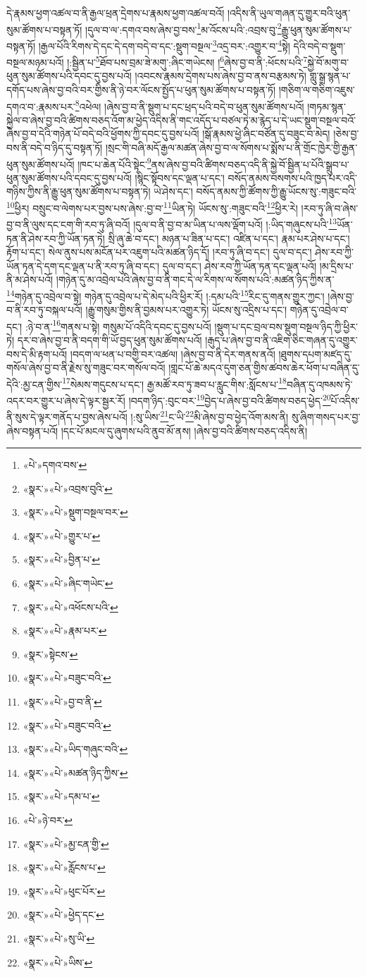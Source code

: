 དེ་རྣམས་ཕྱག་འཚལ་བ་ནི་རྒྱལ་ཕྲན་དྲེགས་པ་རྣམས་ཕྱག་འཚལ་བའོ། །འདིས་ནི་ཡུལ་གཞན་དུ་གྱུར་བའི་ཕུན་སུམ་ཚོགས་པ་བསྟན་ཏོ། །དུལ་བ་ལ་:དགའ་བས་ཞེས་བྱ་བས་\footnote{«པེ་»དགའ་བས་}མ་འོངས་པའི་:འབྲས་བུ་\footnote{«སྣར་»«པེ་»འབྲས་བུའི་}རྒྱུ་ཕུན་སུམ་ཚོགས་པ་བསྟན་ཏོ། །རྒྱལ་པོའི་རིགས་དེ་དང་དེ་དག་བདེ་བ་དང་:སྡུག་བསྔལ་\footnote{«སྣར་»«པེ་»སྡུག་བསྔལ་བར་}འདྲ་བར་:འགྱུར་བ་\footnote{«སྣར་»«པེ་»གྱུར་པ་}སྟེ། དེའི་བདེ་བ་སྡུག་བསྔལ་མཉམ་པའོ། །:སྦྱིན་པ་\footnote{«སྣར་»«པེ་»བྱིན་པ་}ཐོབ་པས་བྲམ་ཟེ་མགུ་:ཞིང་གཡེངས། །\footnote{«སྣར་»«པེ་»ཞིང་གཡེང་}ཞེས་བྱ་བ་ནི་:ཕོངས་པའི་\footnote{«སྣར་»«པེ་»འཕོངས་པའི་}སྐྱེ་བོ་མགུ་བ་ཕུན་སུམ་ཚོགས་པའི་དབང་དུ་བྱས་པའོ། །འབངས་རྣམས་དྲེགས་པས་ཞེས་བྱ་བ་ནས་བརྩམས་ཏེ། གླུ་སྒྲ་སྙན་པ་དགོད་པས་ཞེས་བྱ་བའི་བར་གྱིས་ནི་ཉེ་བར་ལོངས་སྤྱོད་པ་ཕུན་སུམ་ཚོགས་པ་བསྟན་ཏོ། །གཅིག་ལ་གཅིག་འཇུས་དགའ་བ་:རྣམས་པར་\footnote{«སྣར་»«པེ་»རྣམ་པར་}འཕེལ། །ཞེས་བྱ་བ་ནི་སྡུག་པ་དང་ཕྲད་པའི་བདེ་བ་ཕུན་སུམ་ཚོགས་པའོ། །གཏམ་སྙན་སྐྱེལ་བ་ཞེས་བྱ་བའི་ཚིགས་བཅད་འོག་མ་ཕྱེད་འདིས་ནི་གང་འདོད་པ་བཙལ་ཏེ་མ་རྙེད་པ་དེ་ཡང་སྡུག་བསྔལ་བའོ་ཞེས་བྱ་བ་དེའི་གཉེན་པོ་བདེ་བའི་ཕྱོགས་ཀྱི་དབང་དུ་བྱས་པའོ། །སྒོ་རྣམས་ཕྱེ་ཞིང་བཙོན་དུ་བཟུང་བ་མེད། །ཅེས་བྱ་བས་ནི་བདེ་བ་ཉིད་དུ་བསྟན་ཏོ། །སྲང་གི་བཞི་མདོ་རྒྱལ་མཚན་ཞེས་བྱ་བ་ལ་སོགས་པ་སྨོས་པ་ནི་གྲོང་ཁྱེར་གྱི་རྒྱན་ཕུན་སུམ་ཚོགས་པའོ། །ཁང་པ་ཆེན་པོའི་སྟེང་\footnote{«སྣར་»སྟེངས་}ནས་ཞེས་བྱ་བའི་ཚིགས་བཅད་འདི་ནི་སྐྱེ་བོ་སྦྱིན་པ་པོའི་སྒྲུབ་པ་ཕུན་སུམ་ཚོགས་པའི་དབང་དུ་བྱས་པའོ། །སྙིང་སྟོབས་དང་ལྡན་པ་དང་། བསོད་ནམས་བསགས་པའི་ཁྱད་པར་འདི་གཉིས་ཀྱིས་ནི་རྒྱུ་ཕུན་སུམ་ཚོགས་པ་བསྟན་ཏེ། ཡེ་ཤེས་དང་། བསོད་ནམས་ཀྱི་ཚོགས་ཀྱི་རྒྱུ་ཡོངས་སུ་:གཟུང་བའི་\footnote{«སྣར་»«པེ་»བཟུང་བའི་}ཕྱིར། བསྲུང་བ་ལེགས་པར་བྱས་པས་ཞེས་:བྱ་བ་\footnote{«སྣར་»«པེ་»བྱ་བ་ནི་}ཡིན་ཏེ། ཡོངས་སུ་:གཟུང་བའི་\footnote{«སྣར་»«པེ་»བཟུང་བའི་}ཕྱིར་རེ། །རབ་ཏུ་ཞི་བ་ཞེས་བྱ་བ་ནི་ལུས་དང་ངག་གི་རབ་ཏུ་ཞི་བའོ། །དུལ་བ་ནི་བྱ་བ་མ་ཡིན་པ་ལས་ལྡོག་པའོ། །:ཡིད་གཞུངས་པའི་\footnote{«སྣར་»«པེ་»ཡིད་གཞུང་བའི་}ཡོན་ཏན་ནི་ཤེས་རབ་ཀྱི་ཡོན་ཏན་ཏེ། སྲི་ཞུ་ཆེ་བ་དང་། མཉན་པ་ཟིན་པ་དང་། འཛིན་པ་དང་། རྣམ་པར་ཤེས་པ་དང་། རྟོག་པ་དང་། སེལ་ནུས་པས་མངོན་པར་འཇུག་པའི་མཚན་ཉིད་དོ། །རབ་ཏུ་ཞི་བ་དང་། དུལ་བ་དང་། ཤེས་རབ་ཀྱི་ཡོན་ཏན་དེ་དག་དང་ལྡན་པ་ནི་རབ་ཏུ་ཞི་བ་དང་། དུལ་བ་དང་། ཤེས་རབ་ཀྱི་ཡོན་ཏན་དང་ལྡན་པའོ། །མ་དྲིས་པ་ནི་མ་ཤེས་པའོ། །གཉེན་དུ་མ་འབྲེལ་པའི་ཞེས་བྱ་བ་ནི་གང་དེ་ལ་རིགས་ལ་སོགས་པའི་:མཚན་ཉིད་ཀྱིས་ན་\footnote{«སྣར་»«པེ་»མཚན་ཉིད་ཀྱིས་}གཉེན་དུ་འབྲེལ་བ་སྟེ། གཉེན་དུ་འབྲེལ་པ་དེ་མེད་པའི་ཕྱིར་རོ། །:དམ་པའི་\footnote{«སྣར་»«པེ་»དམ་པ་}རིང་དུ་གནས་གྱུར་ཀྱང་། །ཞེས་བྱ་བ་ནི་རབ་ཏུ་བསྐལ་པའོ། །རྒྱུ་གསུམ་གྱིས་ནི་བྱམས་པར་འགྱུར་ཏེ། ཡོངས་སུ་འདྲིས་པ་དང་། གཉེན་དུ་འབྲེལ་བ་དང་། :ཉེ་བ་ན་\footnote{«པེ་»ཉེ་བར་}གནས་པ་སྟེ། གསུམ་པོ་འདིའི་དབང་དུ་བྱས་པའོ། །སྡུག་པ་དང་བྲལ་བས་སྡུག་བསྔལ་ཉིད་ཀྱི་ཕྱིར་ཏེ། དར་བ་ཞེས་བྱ་བ་ནི་བདག་གི་ཡོ་བྱད་ཕུན་སུམ་ཚོགས་པའོ། །རྒུད་པ་ཞེས་བྱ་བ་ནི་འཇིག་ཅིང་གཞན་དུ་འགྱུར་བས་དེ་མི་རྟག་པའོ། །བདག་ལ་ཕན་པ་བགྱི་བར་འཚལ། །ཞེས་བྱ་བ་ནི་དེར་གནས་ནའོ། །ཐུགས་དཔག་མཛད་དུ་གསོལ་ཞེས་བྱ་བ་ནི་རྗེས་སུ་གཟུང་བར་གསོལ་བའོ། །གླང་པོ་ཆེ་མདའ་དུག་ཅན་གྱིས་ཚབས་ཆེར་ཕོག་པ་བཞིན་དུ་དེའི་:མྱ་ངན་གྱིས་\footnote{«སྣར་»«པེ་»མྱ་ངན་གྱི་}སེམས་གདུངས་པ་དང་། རྒྱ་མཚོ་རབ་ཏུ་ཟབ་པ་རླུང་གིས་:སློངས་པ་\footnote{«སྣར་»«པེ་»རློངས་པ་}བཞིན་དུ་འཁམས་ཏེ་འདར་བར་གྱུར་པ་ཞེས་དེ་ལྟར་སྦྱར་རོ། །བདག་ཉིད་:བུང་བར་\footnote{«སྣར་»«པེ་»ཕུང་པོར་}བྱེད་པ་ཞེས་བྱ་བའི་ཚིགས་བཅད་ཕྱེད་\footnote{«སྣར་»«པེ་»ཕྱེད་དང་}པོ་འདིས་ནི་སུས་དེ་ལྟར་གནོད་པ་བྱས་ཞེས་པའོ། །:སུ་ཡིས་\footnote{«སྣར་»«པེ་»སུ་ཡི་}ང་ཡི་\footnote{«སྣར་»«པེ་»ཡིས་}མི་ཞེས་བྱ་བ་ཕྱེད་འོག་མས་ནི། སུ་ཞིག་གསད་པར་བྱ་ཞེས་བསྟན་པའོ། །དང་པོ་མངལ་དུ་ཞུགས་པའི་ནུབ་མོ་ནས། །ཞེས་བྱ་བའི་ཚིགས་བཅད་འདིས་ནི། 